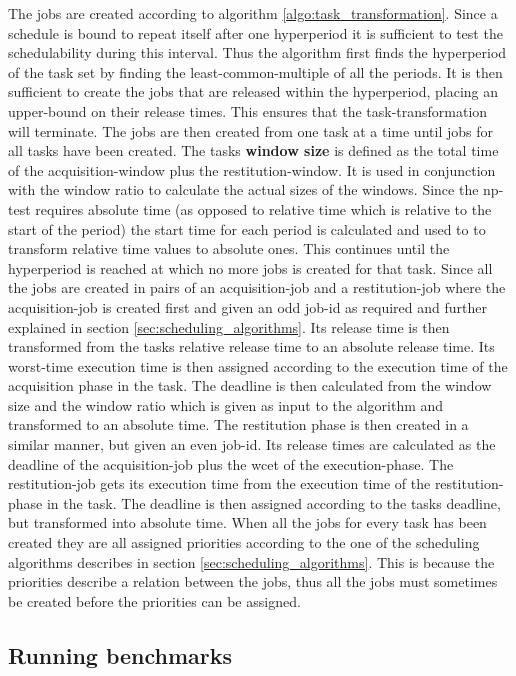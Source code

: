 \documentclass{kththesis}
\begin{document}
The jobs are created according to algorithm \ref{algo:task_transformation}. Since a schedule is
bound to repeat itself after one hyperperiod it is sufficient to test the schedulability during this
interval. Thus the algorithm first finds the hyperperiod of the task set by finding the
least-common-multiple of all the periods. It is then sufficient to create the jobs that are released
within the hyperperiod, placing an upper-bound on their release times. This ensures that the
task-transformation will terminate. The jobs are then created from one task at a time until jobs for
all tasks have been created. The tasks \textbf{window size} is defined as the total time of the
acquisition-window plus the restitution-window. It is used in conjunction with the window ratio to
calculate the actual sizes of the windows. Since the \acrshort{np}-test requires absolute time
(as opposed to relative time which is relative to the start of the period) the start time for each
period is calculated and used to to transform relative time values to absolute ones. This continues
until the hyperperiod is reached at which no more jobs is created for that task. Since all the jobs
are created in pairs of an acquisition-job and a restitution-job where the acquisition-job is
created first and given an odd job-id as required and further explained in section
\ref{sec:scheduling_algorithms}. Its release time is then transformed from the tasks relative
release time to an absolute release time.  Its worst-time execution time is then assigned according
to the execution time of the acquisition phase in the task. The deadline is then calculated from the
window size and the window ratio which is given as input to the algorithm and transformed to an
absolute time. The restitution phase is then created in a similar manner, but given an even job-id.
Its release times are calculated as the deadline of the acquisition-job plus the \acrshort{wcet} of
the execution-phase. The restitution-job gets its execution time from the execution time of the
restitution-phase in the task. The deadline is then assigned according to the tasks deadline, but
transformed into absolute time. When all the jobs for every task has been created they are all
assigned priorities according to the one of the scheduling algorithms describes in section
\ref{sec:scheduling_algorithms}. This is because the priorities describe a relation between the
jobs, thus all the jobs must sometimes be created before the priorities can be assigned. 


\subsection{Running benchmarks}\label{subsec:running_benchmarks}
\end{document}
